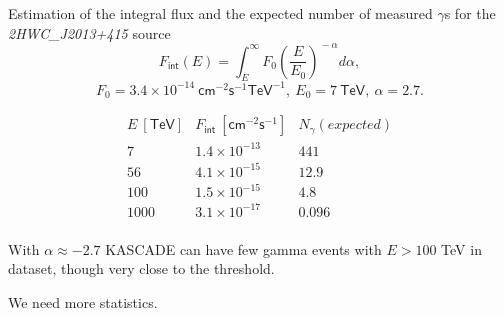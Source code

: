 \begin{frame}{Estimation of the integral flux and the expected number of measured $\gamma$s for the \textit{2HWC\_J2013+415} source}
\vspace{-3ex}
\[
F_\mathsf{int}(E) = \int_{E}^{\infty}F_0\left(\frac{E}{E_0}\right)^{\!\!-\alpha}d\alpha,
\]
\[
F_0 = 3.4\times10^{-14}~\mathsf{cm}^{-2} \mathsf{s}^{-1} \mathsf{TeV}^{-1},~
E_0 = 7~\mathsf{TeV},~
\alpha = 2.7.
\]

\vspace{-1ex}
\[
\begin{array}{ccc}
E~[\mathsf{TeV}] & F_\mathsf{int}~[\mathsf{cm}^{-2}\mathsf{s}^{-1}] & N_\gamma (expected) \\\hline
7  & 1.4\times10^{-13} & 441\\
56  & 4.1\times10^{-15} & 12.9\\
100 & 1.5\times10^{-15} & 4.8 \\
1000 & 3.1\times10^{-17} & 0.096\\
\end{array}
\]

\vspace{0.4ex}
\normalsize
With $\alpha \approx -2.7$ KASCADE can have few gamma events with $E > 100$ TeV in dataset, though very close to the threshold. 


We need more statistics.
\end{frame}
